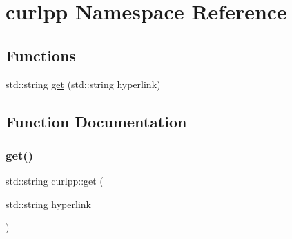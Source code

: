 \hypertarget{a00035}{}\section{curlpp Namespace Reference}
\label{a00035}
\subsection*{Functions}
\begin{DoxyCompactItemize}
\item 
std\+::string \hyperlink{a00035_acbba0862979b2ae3a4d2a73369f42820}{get} (std\+::string hyperlink)
\end{DoxyCompactItemize}


\subsection{Function Documentation}
\mbox{\label{a00035_acbba0862979b2ae3a4d2a73369f42820}} 
\subsubsection{\texorpdfstring{get()}{get()}}
{\footnotesize\ttfamily std\+::string curlpp\+::get (\begin{DoxyParamCaption}\item[{std\+::string}]{hyperlink }\end{DoxyParamCaption})}

